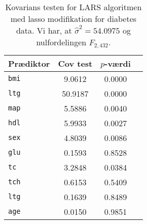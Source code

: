 \begin{table}[ht] 
\centering 
\begin{tabular}{lccc}
\toprule
Prædiktor & Cov test & \(p\)-værdi \\
\midrule
\texttt{bmi} & 9.0612 & 0.0000 \\
\texttt{ltg} &50.9187 & 0.0000 \\
 \texttt{map}     &       5.5886 & 0.0040 \\
 \texttt{hdl}      &    5.9933 & 0.0027 \\
\texttt{sex}     &   4.8039 & 0.0086 \\
\texttt{glu}     &  0.1593 & 0.8528 \\
\texttt{tc}  &         3.2848 & 0.0384 \\
\texttt{tch}    &        0.6153 & 0.5409 \\
\texttt{ltg}    &        0.1639 & 0.8489 \\
\texttt{age} &       0.0150 & 0.9851 \\ \bottomrule
\end{tabular}
\caption{Kovarians testen for LARS algoritmen med lasso modifikation for diabetes data. Vi har, at \(\widehat{\sigma}^2 = 54.0975\) og nulfordelingen \(F_{2,432}\).} \label{tab:diabetes_covTest}
\end{table} 